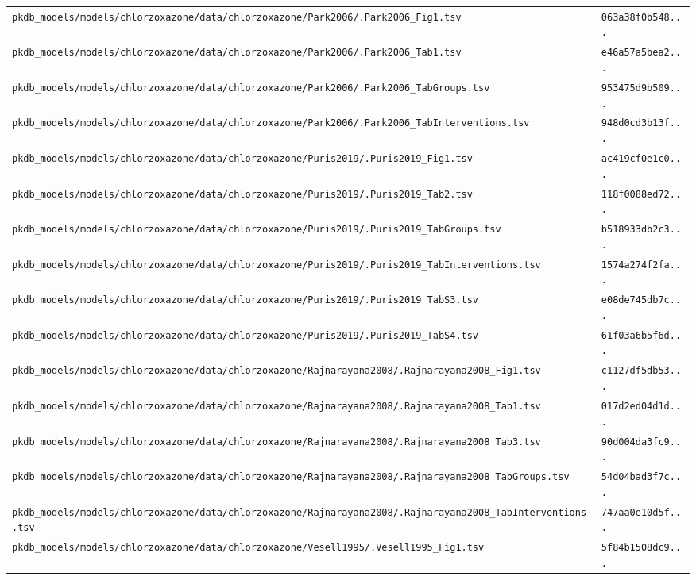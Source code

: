 \begin{longtable}{ll}
\texttt{pkdb\_models/models/chlorzoxazone/data/chlorzoxazone/Park2006/.Park2006\_Fig1.tsv} & \texttt{063a38f0b548...} \\
\texttt{pkdb\_models/models/chlorzoxazone/data/chlorzoxazone/Park2006/.Park2006\_Tab1.tsv} & \texttt{e46a57a5bea2...} \\
\texttt{pkdb\_models/models/chlorzoxazone/data/chlorzoxazone/Park2006/.Park2006\_TabGroups.tsv} & \texttt{953475d9b509...} \\
\texttt{pkdb\_models/models/chlorzoxazone/data/chlorzoxazone/Park2006/.Park2006\_TabInterventions.tsv} & \texttt{948d0cd3b13f...} \\
\texttt{pkdb\_models/models/chlorzoxazone/data/chlorzoxazone/Puris2019/.Puris2019\_Fig1.tsv} & \texttt{ac419cf0e1c0...} \\
\texttt{pkdb\_models/models/chlorzoxazone/data/chlorzoxazone/Puris2019/.Puris2019\_Tab2.tsv} & \texttt{118f0088ed72...} \\
\texttt{pkdb\_models/models/chlorzoxazone/data/chlorzoxazone/Puris2019/.Puris2019\_TabGroups.tsv} & \texttt{b518933db2c3...} \\
\texttt{pkdb\_models/models/chlorzoxazone/data/chlorzoxazone/Puris2019/.Puris2019\_TabInterventions.tsv} & \texttt{1574a274f2fa...} \\
\texttt{pkdb\_models/models/chlorzoxazone/data/chlorzoxazone/Puris2019/.Puris2019\_TabS3.tsv} & \texttt{e08de745db7c...} \\
\texttt{pkdb\_models/models/chlorzoxazone/data/chlorzoxazone/Puris2019/.Puris2019\_TabS4.tsv} & \texttt{61f03a6b5f6d...} \\
\texttt{pkdb\_models/models/chlorzoxazone/data/chlorzoxazone/Rajnarayana2008/.Rajnarayana2008\_Fig1.tsv} & \texttt{c1127df5db53...} \\
\texttt{pkdb\_models/models/chlorzoxazone/data/chlorzoxazone/Rajnarayana2008/.Rajnarayana2008\_Tab1.tsv} & \texttt{017d2ed04d1d...} \\
\texttt{pkdb\_models/models/chlorzoxazone/data/chlorzoxazone/Rajnarayana2008/.Rajnarayana2008\_Tab3.tsv} & \texttt{90d004da3fc9...} \\
\texttt{pkdb\_models/models/chlorzoxazone/data/chlorzoxazone/Rajnarayana2008/.Rajnarayana2008\_TabGroups.tsv} & \texttt{54d04bad3f7c...} \\
\texttt{pkdb\_models/models/chlorzoxazone/data/chlorzoxazone/Rajnarayana2008/.Rajnarayana2008\_TabInterventions.tsv} & \texttt{747aa0e10d5f...} \\
\texttt{pkdb\_models/models/chlorzoxazone/data/chlorzoxazone/Vesell1995/.Vesell1995\_Fig1.tsv} & \texttt{5f84b1508dc9...} \\

\end{longtable}
